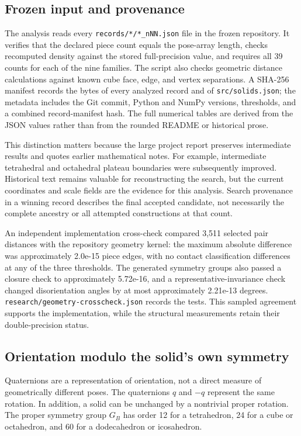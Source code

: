 \documentclass[11pt,a4paper]{article}
\begin{document}
\subsection{Frozen input and provenance}

The analysis reads every \nolinkurl{records/*/*_nNN.json} file in the frozen repository. It verifies that the declared piece count equals the pose-array length, checks recomputed density against the stored full-precision value, and requires all 39 counts for each of the nine families. The script also checks geometric distance calculations against known cube face, edge, and vertex separations. A SHA-256 manifest records the bytes of every analyzed record and of \nolinkurl{src/solids.json}; the metadata includes the Git commit, Python and NumPy versions, thresholds, and a combined record-manifest hash. The full numerical tables are derived from the JSON values rather than from the rounded README or historical prose.

This distinction matters because the large project report preserves intermediate results and quotes earlier mathematical notes. For example, intermediate tetrahedral and octahedral plateau boundaries were subsequently improved. Historical text remains valuable for reconstructing the search, but the current coordinates and scale fields are the evidence for this analysis. Search provenance in a winning record describes the final accepted candidate, not necessarily the complete ancestry or all attempted constructions at that count.

An independent implementation cross-check compared 3,511 selected pair distances with the repository geometry kernel: the maximum absolute difference was approximately 2.0e-15 piece edges, with no contact classification differences at any of the three thresholds. The generated symmetry groups also passed a closure check to approximately 5.72e-16, and a representative-invariance check changed disorientation angles by at most approximately 2.21e-13 degrees. \nolinkurl{research/geometry-crosscheck.json} records the tests. This sampled agreement supports the implementation, while the structural measurements retain their double-precision status.

\subsection{Orientation modulo the solid's own symmetry}

Quaternions are a representation of orientation, not a direct measure of geometrically different poses. The quaternions $q$ and $-q$ represent the same rotation. In addition, a solid can be unchanged by a nontrivial proper rotation. The proper symmetry group $G_B$ has order 12 for a tetrahedron, 24 for a cube or octahedron, and 60 for a dodecahedron or icosahedron.
\end{document}
